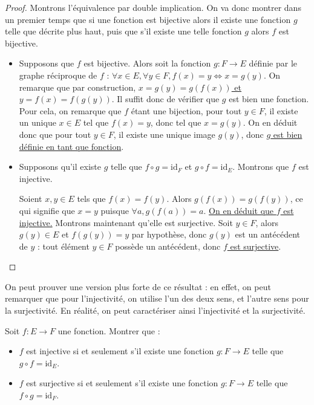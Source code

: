 \begin{proof}
    Montrons l'équivalence par double implication. On va donc montrer dans un premier temps que si une fonction est bijective alors il existe une fonction $g$ telle que décrite plus haut, puis que s'il existe une telle fonction $g$ alors $f$ est bijective.
    
    \begin{itemize}[label=]
        \item \fbox{$\Rightarrow$} Supposons que $f$ est bijective. Alors soit la fonction $g : F \to E$ définie par le graphe réciproque de $f$ : $\forall x \in E, \forall y \in F, f(x)=y \iff x=g(y)$. On remarque que par construction, \underline{$x=g(y)=g(f(x))$ et $y=f(x)=f(g(y))$}. Il suffit donc de vérifier que $g$ est bien une fonction. Pour cela, on remarque que $f$ étant une bijection, pour tout $y\in F$, il existe un unique $x\in E$ tel que $f(x)=y$, donc tel que $x=g(y)$. On en déduit donc que pour tout $y\in F$, il existe une unique image $g(y)$, donc \underline{$g$ est bien définie en tant que fonction}.
        
        \item \fbox{$\Leftarrow$} Supposons qu'il existe $g$ telle que $f\circ g =\mathrm{id}_F$ et $g\circ f = \mathrm{id}_E$. Montrons que $f$ est injective.
        
        Soient $x,y\in E$ tels que $f(x)=f(y)$. Alors $g(f(x))=g(f(y))$, ce qui signifie que $x=y$ puisque $\forall a, g(f(a))=a$. \underline{On en déduit que $f$ est injective.} Montrons maintenant qu'elle est surjective. Soit $y\in F$, alors $g(y)\in E$ et $f(g(y))=y$ par hypothèse, donc $g(y)$ est un antécédent de $y$ : tout élément $y\in F$ possède un antécédent, donc \underline{$f$ est surjective}.
        
    \end{itemize}
\end{proof}

On peut prouver une version plus forte de ce résultat : en effet, on peut remarquer que pour l'injectivité, on utilise l'un des deux sens, et l'autre sens pour la surjectivité. En réalité, on peut caractériser ainsi l'injectivité et la surjectivité.

\begin{exo}
    Soit $f : E \to F$ une fonction. Montrer que :
    \begin{itemize}
        \item $f$ est injective si et seulement s'il existe une fonction $g : F \to E$ telle que $g\circ f = \mathrm{id}_E$.
        \item $f$ est surjective si et seulement s'il existe une fonction $g : F\to E$ telle que $f\circ g = \mathrm{id}_F$.
    \end{itemize}
\end{exo}

